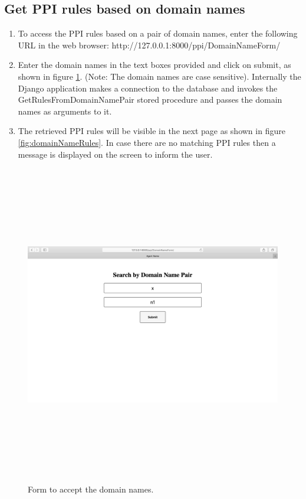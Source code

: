 \documentclass[msc,deptreport,ai]{infthesis}      %
\begin{document}
\subsection {Get PPI rules based on domain names}
\begin{enumerate}
	\item To access the PPI rules based on a pair of domain names, enter the following URL in the web browser: http://127.0.0.1:8000/ppi/DomainNameForm/
	\item Enter the domain names in the text boxes provided and click on submit, as shown in figure \ref{fig:domainNameForm}. (Note: The domain names are case sensitive). Internally the Django application makes a connection to the database and invokes the GetRulesFromDomainNamePair stored procedure and passes the domain names as arguments to it.
	\item The retrieved PPI rules will be visible in the next page as shown in figure \ref{fig:domainNameRules}. In case there are no matching PPI rules then a message is displayed on the screen to inform the user.
\end{enumerate}
	 \begin{figure}[H]
		\centering
		\captionsetup{justification=centering}
		\includegraphics[width=\linewidth,height=14cm,keepaspectratio]{DomainNameForm.png}	
		\caption{Form to accept the domain names.}
		\label{fig:domainNameForm}		
	\end{figure}
\end{document}

